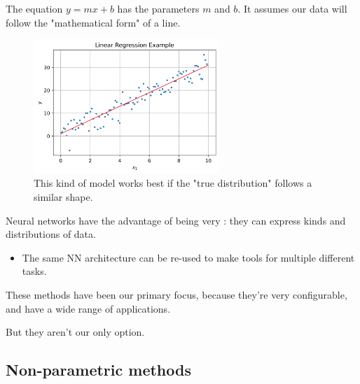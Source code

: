         \miniex The equation $y=mx+b$ has the  parameters $m$ and $b$. It assumes our data will follow the "mathematical form" of a line.
    
        \begin{figure}[H]
            \centering
            \includegraphics[width=70mm,scale=0.5]{images/regression_images/Regression_Example_Good_Fit.png}
        
            \caption*{This kind of model works best if the "true distribution" follows a similar shape.}
        \end{figure}
    
        Neural networks have the advantage of being very : they can express  kinds and distributions of data.

        \begin{itemize}
            \item The same NN architecture can be re-used to make tools for multiple different tasks.
            
        \end{itemize}
            
    
        These methods have been our primary focus, because they're very configurable, and have a wide range of applications.

        But they aren't our only option.



    \phantom{}

    \subsection{Non-parametric methods}

